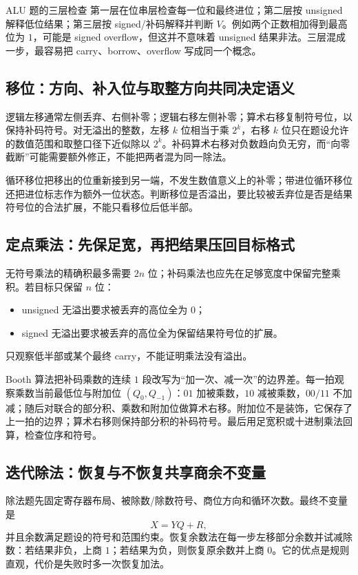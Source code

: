 \documentclass[UTF8,fontset=fandol,11pt,a4paper]{ctexart}
\begin{document}
\begin{warnbox}{ALU 题的三层检查}
第一层在位串层检查每一位和最终进位；第二层按 unsigned 解释低位结果；第三层按 signed/补码解释并判断 $V$。例如两个正数相加得到最高位为 $1$，可能是 signed overflow，但这并不意味着 unsigned 结果非法。三层混成一步，最容易把 carry、borrow、overflow 写成同一个概念。
\end{warnbox}

\subsection{移位：方向、补入位与取整方向共同决定语义}

逻辑左移通常左侧丢弃、右侧补零；逻辑右移左侧补零；算术右移复制符号位，以保持补码符号。对无溢出的整数，左移 $k$ 位相当于乘 $2^k$，右移 $k$ 位只在题设允许的数值范围和取整口径下近似除以 $2^k$。补码算术右移对负数趋向负无穷，而“向零截断”可能需要额外修正，不能把两者混为同一除法。

循环移位把移出的位重新接到另一端，不发生数值意义上的补零；带进位循环移位还把进位标志作为额外一位状态。判断移位是否溢出，要比较被丢弃位是否是结果符号位的合法扩展，不能只看移位后低半部。

\subsection{定点乘法：先保足宽，再把结果压回目标格式}

无符号乘法的精确积最多需要 $2n$ 位；补码乘法也应先在足够宽度中保留完整乘积。若目标只保留 $n$ 位：
\begin{itemize}
  \item unsigned 无溢出要求被丢弃的高位全为 $0$；
  \item signed 无溢出要求被丢弃的高位全为保留结果符号位的扩展。
\end{itemize}
只观察低半部或某个最终 carry，不能证明乘法没有溢出。

Booth 算法把补码乘数的连续 $1$ 段改写为“加一次、减一次”的边界差。每一拍观察乘数当前最低位与附加位 $(Q_0,Q_{-1})$：$01$ 加被乘数，$10$ 减被乘数，$00/11$ 不加减；随后对联合的部分积、乘数和附加位做算术右移。附加位不是装饰，它保存了上一拍的边界；算术右移则保持部分积的补码符号。最后用足宽积或十进制乘法回算，检查位序和符号。

\subsection{迭代除法：恢复与不恢复共享商余不变量}

除法题先固定寄存器布局、被除数/除数符号、商位方向和循环次数。最终不变量是
\[
X=YQ+R,
\]
并且余数满足题设的符号和范围约束。恢复余数法在每一步左移部分余数并试减除数：若结果非负，上商 $1$；若结果为负，则恢复原余数并上商 $0$。它的优点是规则直观，代价是失败时多一次恢复加法。
\end{document}
